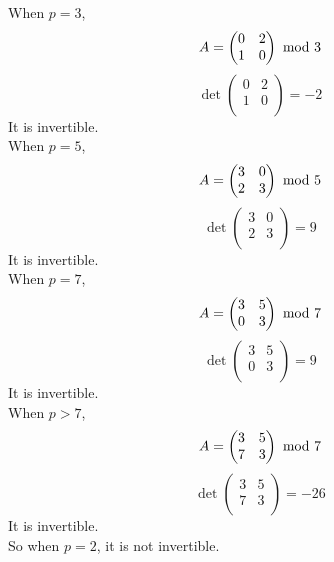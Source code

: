 \documentclass{article}
\renewcommand{\mod}{{\rm\ mod\ }}
\begin{document}
\begin{enumerate}
When $p=3$,
$$A=\begin{pmatrix}0&2\\1&0\\\end{pmatrix}\mod 3$$
$$\det\begin{pmatrix}0&2\\1&0\\\end{pmatrix}=-2$$
It is invertible.\\

When $p=5$,
$$A=\begin{pmatrix}3&0\\2&3\\\end{pmatrix}\mod 5$$
$$\det\begin{pmatrix}3&0\\2&3\\\end{pmatrix}=9$$
It is invertible.\\

When $p=7$,
$$A=\begin{pmatrix}3&5\\0&3\\\end{pmatrix}\mod 7$$
$$\det\begin{pmatrix}3&5\\0&3\\\end{pmatrix}=9$$
It is invertible.\\

When $p>7$,
$$A=\begin{pmatrix}3&5\\7&3\\\end{pmatrix}\mod 7$$
$$\det\begin{pmatrix}3&5\\7&3\\\end{pmatrix}=-26$$
It is invertible.\\

So when $p=2$, it is not invertible.


\end{enumerate}
\end{document}
